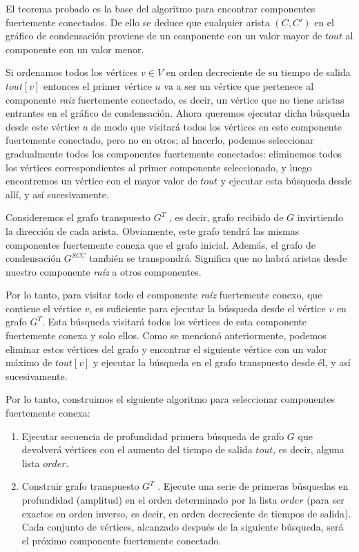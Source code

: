 El teorema probado es la base del algoritmo para encontrar componentes fuertemente conectados. De ello 
se deduce que cualquier arista $(C, C')$ en el gráfico de condensación proviene de un componente con un 
valor mayor de $tout$ al componente con un valor menor.

Si ordenamos todos los vértices $v \in V$ en orden decreciente de su tiempo de salida $tout[v]$ entonces el primer vértice $u$ va a ser un vértice que pertenece al componente \emph{raiz} fuertemente 
conectado, es decir, un vértice que no tiene aristas entrantes en el gráfico de condensación. Ahora 
queremos ejecutar dicha búsqueda desde este vértice $u$ de modo que visitará todos los vértices en 
este componente fuertemente conectado, pero no en otros; al hacerlo, podemos seleccionar gradualmente 
todos los componentes fuertemente conectados: eliminemos todos los vértices correspondientes al primer 
componente seleccionado, y luego encontremos un vértice con el mayor valor de $tout$ y ejecutar esta 
búsqueda desde allí, y así sucesivamente.

Consideremos el grafo transpuesto $G^T$ , es decir, grafo recibido de $G$ invirtiendo la dirección 
de cada arista. Obviamente, este grafo tendrá las mismas componentes fuertemente conexa que el
grafo inicial. Además, el grafo de condensación $G^{SCC}$ también se transpondrá. Significa que no 
habrá aristas desde nuestro componente \emph{raíz} a otros componentes.

Por lo tanto, para visitar todo el componente \emph{raíz} fuertemente conexo, que contiene el vértice $v$, es suficiente para ejecutar la búsqueda desde el vértice $v$ en grafo $G^T$. Esta búsqueda visitará todos los vértices de esta componente fuertemente conexa y solo ellos. Como se mencionó 
anteriormente, podemos eliminar estos vértices del grafo y encontrar el siguiente vértice con un 
valor máximo de $tout[v]$ y ejecutar la búsqueda en el grafo transpuesto desde él, y así 
sucesivamente.

Por lo tanto, construimos el siguiente algoritmo para seleccionar componentes fuertemente conexa:

\begin{enumerate}
	\item Ejecutar secuencia de profundidad primera búsqueda de grafo $G$ que devolverá vértices con 
	el aumento del tiempo de salida $tout$, es decir, alguna lista $order$.
	
	\item Construir grafo transpuesto $G^T$ . Ejecute una serie de primeras búsquedas en profundidad 
	(amplitud) en el orden determinado por la lista $order$ (para ser exactos en orden inverso, es 
	decir, en orden decreciente de tiempos de salida). Cada conjunto de vértices, alcanzado después de 
	la siguiente búsqueda, será el próximo componente fuertemente conectado.
\end{enumerate}


